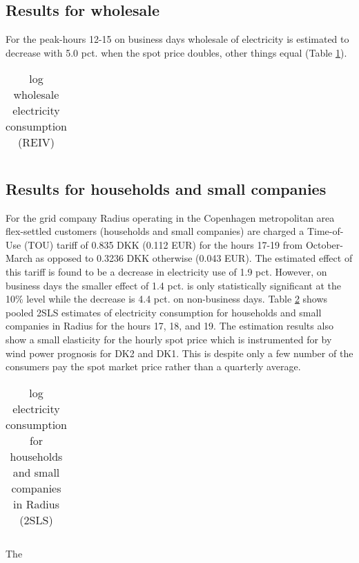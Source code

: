 \label{sec:results}
\subsection{Results for wholesale}
\label{subsec:r_wholesale}
For the peak-hours 12-15 on business days wholesale of electricity is estimated to decrease with 5.0 pct. when the spot price doubles, other things equal (Table \ref{tab:ws_preferred}).
\begin{table}[H]
  \vspace{-0.0cm}
  \centering
  \caption{log wholesale electricity consumption (REIV)}
  \footnotesize
    \begin{tabular}{lcccc}
      \toprule
        
    \end{tabular}
  \label{tab:ws_preferred}
  \vspace{-0.0cm}
\end{table}


\subsection{Results for households and small companies}
For the grid company Radius operating in the Copenhagen metropolitan area flex-settled customers (households and small companies) are charged a Time-of-Use (TOU) tariff of 0.835 DKK (0.112 EUR) for the hours 17-19 from October-March as opposed to 0.3236 DKK otherwise (0.043 EUR). The estimated effect of this tariff is found to be a decrease in electricity use of 1.9 pct. However, on business days the smaller effect of 1.4 pct. is only statistically significant at the 10\% level while the decrease is 4.4 pct. on non-business days. Table \ref{tab:hh_17-19} shows pooled 2SLS estimates of electricity consumption for households and small companies in Radius for the hours 17, 18, and 19. The estimation results also show a small elasticity for the hourly spot price which is instrumented for by wind power prognosis for DK2 and DK1. This is despite only a few number of the consumers pay the spot market price rather than a quarterly average.
\label{subsec:r_households}
\begin{table}[H]
  \vspace{-0.0cm}
  \centering
  \caption{log electricity consumption for households and small companies in Radius (2SLS)}
  \footnotesize
    \begin{tabular}{lccc}
      \toprule
        
    \end{tabular}
  \label{tab:hh_17-19}
  \vspace{-0.0cm}
\end{table}
The

